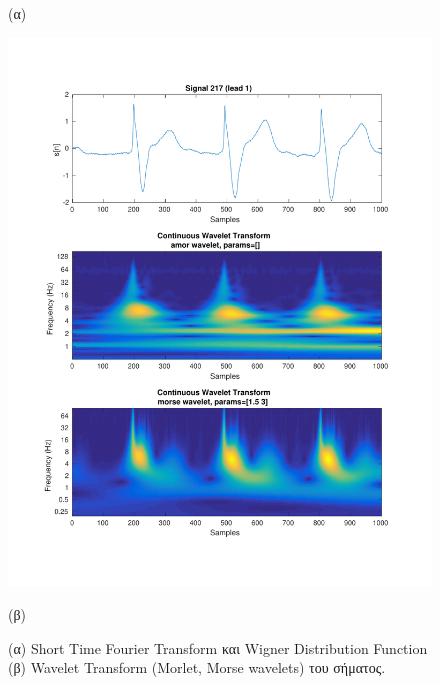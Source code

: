 \documentclass[11pt,a4paper]{article}
\begin{document}
\begin{figure}[H]
\begin{minipage}{0.48\textwidth}
	(α)
\end{minipage}
\begin{minipage}{0.48\textwidth}
	\centering
	\includegraphics[width=\textwidth]{fig/217l1_cwt.pdf}
	
	(β)
\end{minipage}
\vfill
\caption{(α) Short Time Fourier Transform και Wigner Distribution Function (β) Wavelet Transform (Morlet, Morse wavelets) του σήματος.}
\label{fig:217l1_stft_wdf_wt}
\end{figure}
\end{document}
